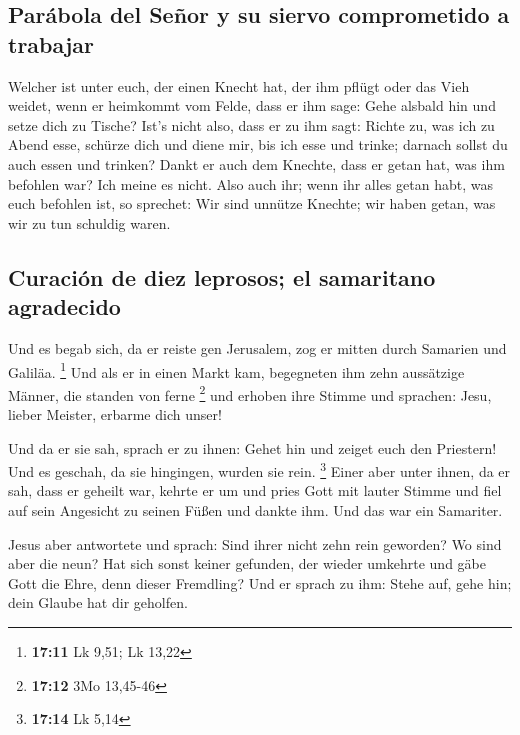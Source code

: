 \hypertarget{paruxe1bola-del-seuxf1or-y-su-siervo-comprometido-a-trabajar}{%
\subsection{Parábola del Señor y su siervo comprometido a
trabajar}\label{paruxe1bola-del-seuxf1or-y-su-siervo-comprometido-a-trabajar}}

 Welcher ist unter euch, der einen Knecht hat, der ihm
pflügt oder das Vieh weidet, wenn er heimkommt vom Felde, dass er ihm
sage: Gehe alsbald hin und setze dich zu Tische?  Ist's
nicht also, dass er zu ihm sagt: Richte zu, was ich zu Abend esse,
schürze dich und diene mir, bis ich esse und trinke; darnach sollst du
auch essen und trinken?  Dankt er auch dem Knechte, dass
er getan hat, was ihm befohlen war? Ich meine es nicht. 
Also auch ihr; wenn ihr alles getan habt, was euch befohlen ist, so
sprechet: Wir sind unnütze Knechte; wir haben getan, was wir zu tun
schuldig waren.

\hypertarget{curaciuxf3n-de-diez-leprosos-el-samaritano-agradecido}{%
\subsection{Curación de diez leprosos; el samaritano
agradecido}\label{curaciuxf3n-de-diez-leprosos-el-samaritano-agradecido}}

 Und es begab sich, da er reiste gen Jerusalem, zog er
mitten durch Samarien und Galiläa. \footnote{\textbf{17:11} Lk 9,51; Lk
  13,22}  Und als er in einen Markt kam, begegneten ihm
zehn aussätzige Männer, die standen von ferne \footnote{\textbf{17:12}
  3Mo 13,45-46}  und erhoben ihre Stimme und sprachen:
Jesu, lieber Meister, erbarme dich unser!

 Und da er sie sah, sprach er zu ihnen: Gehet hin und
zeiget euch den Priestern! Und es geschah, da sie hingingen, wurden sie
rein. \footnote{\textbf{17:14} Lk 5,14}  Einer aber unter
ihnen, da er sah, dass er geheilt war, kehrte er um und pries Gott mit
lauter Stimme  und fiel auf sein Angesicht zu seinen
Füßen und dankte ihm. Und das war ein Samariter.

 Jesus aber antwortete und sprach: Sind ihrer nicht zehn
rein geworden? Wo sind aber die neun?  Hat sich sonst
keiner gefunden, der wieder umkehrte und gäbe Gott die Ehre, denn dieser
Fremdling?  Und er sprach zu ihm: Stehe auf, gehe hin;
dein Glaube hat dir geholfen.

